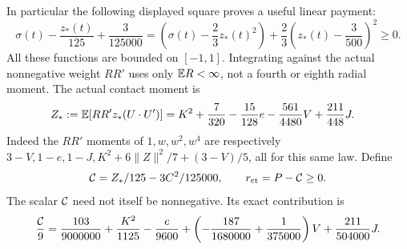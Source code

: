 In particular the following displayed square proves a useful linear payment:
\begin{equation}\label{contact-paid}
 \sigma(t)-\frac{z_*(t)}{125}+\frac3{125000}
   =\left(\sigma(t)-\frac23z_*(t)^2\right)
       +\frac23\left(z_*(t)-\frac3{500}\right)^2\ge0.
\end{equation}
All these functions are bounded on $[-1,1]$. Integrating against the actual
nonnegative weight $RR'$ uses only $\mathbb E R<\infty$, not a fourth or eighth
radial moment. The actual contact moment is
\begin{align}\label{Zstar}
 Z_*:=\mathbb E[RR'z_*(U\cdot U')]
   &=K^2+\frac7{320}-\frac{15}{128}e
                    -\frac{561}{4480}V+\frac{211}{448}J.
\end{align}
Indeed the $RR'$ moments of $1,w,w^2,w^4$ are respectively
$3-V,1-e,1-J,K^2+6\|Z\|^2/7+(3-V)/5$, all for this same law.
Define
\begin{equation}\label{Cstar8}
 {\cal C}=Z_*/125-3C^2/125000,\qquad
 r_{\rm ct}=P-{\cal C}\ge0.
\end{equation}
The scalar ${\cal C}$ need not itself be nonnegative. Its exact contribution is
\begin{equation}\label{paid-expansion}
 \frac{{\cal C}}{9}=\frac{103}{9000000}+\frac{K^2}{1125}
 -\frac e{9600}+\left(-\frac{187}{1680000}+\frac1{375000}\right)V
                       +\frac{211}{504000}J.
\end{equation}
